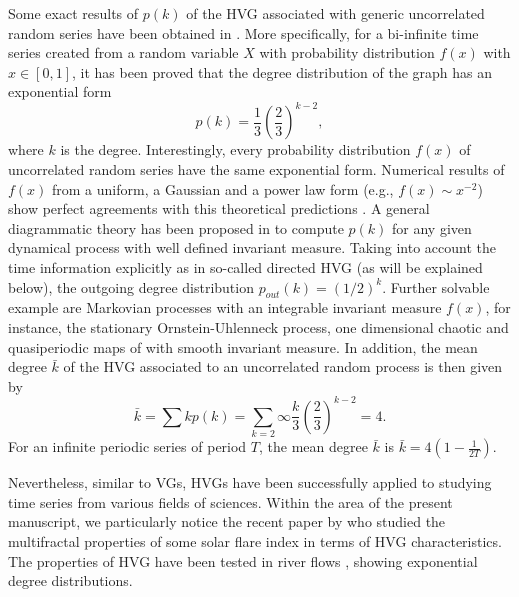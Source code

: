 		Some exact results of $p(k)$ of the HVG associated with generic uncorrelated random series have been obtained in \cite{Luque2009}. More specifically, for a bi-infinite time series created from a random variable $X$ with probability distribution $f(x)$ with $x\in [0, 1]$, it has been proved that the degree distribution of the graph has an exponential form 
		\begin{equation}\label{pkhvg}
		p(k) = \frac{1}{3} (\frac{2}{3})^{k-2}, 
		\end{equation}
where $k$ is the degree. Interestingly, every probability distribution $f(x)$ of uncorrelated random series have the same exponential form. Numerical results of $f(x)$ from a uniform, a Gaussian and a power law form (e.g., $f(x) \sim x^{-2}$) show perfect agreements with this theoretical predictions \cite{Luque2009}. A general diagrammatic theory has been proposed in \cite{Lacasa2014b} to compute $p(k)$ for any given dynamical process with well defined invariant measure. Taking into account the time information explicitly as in so-called directed HVG (as will be explained below), the outgoing degree distribution $p_{out}(k) = (1/2)^{k}$. Further solvable example are Markovian processes with an integrable invariant measure $f(x)$, for instance, the stationary Ornstein-Uhlenneck process, one dimensional chaotic and quasiperiodic maps of with smooth invariant measure. In addition, the mean degree $\bar{k}$ of the HVG associated to an uncorrelated random process is then given by 
\begin{equation}
\bar{k} = \sum k p(k) = \sum_{k=2}{\infty} \frac{k}{3}{(\frac{2}{3})}^{k-2} = 4.
\end{equation}
For an infinite periodic series of period $T$, the mean degree $\bar{k}$ is $\bar{k} = 4 ( 1 - \frac{1}{2T})$. 
	
		Nevertheless, similar to VGs, HVGs have been successfully applied to studying time series from various fields of sciences. Within the area of the present manuscript, we particularly notice the recent paper by \cite{Yu2012} who studied the multifractal properties of some solar flare index in terms of HVG characteristics. The properties of HVG have been tested in river flows \cite{Braga2016}, showing exponential degree distributions. 
		
